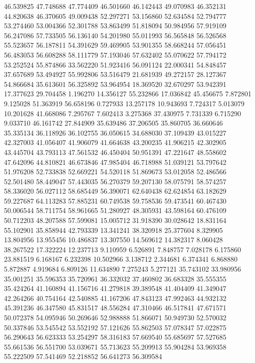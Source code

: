 46.539825
47.748688
47.774409
46.501660
46.142443
49.070983
46.352131
44.820638
46.370605
49.009438
52.297271
53.156860
52.634584
52.794777
53.274460
53.004366
52.301788
53.863499
51.818094
50.984956
57.919109
56.247086
57.733505
56.136140
54.201980
55.011993
56.565848
56.526568
55.523657
56.187811
54.391629
59.469905
53.901355
58.668244
57.056451
56.483053
56.608288
58.111779
57.193046
57.632402
55.070622
57.794172
53.252524
55.874866
33.562220
51.923416
56.091124
22.000341
54.848457
37.657689
53.494927
55.992806
53.516479
21.681939
49.272157
28.127367
54.866684
35.613601
56.325892
53.964954
18.369520
32.670297
53.942391
17.377623
29.704458
1.196270
14.356127
55.232866
17.036842
45.456675
7.872801
9.125028
51.363919
56.658196
0.727933
13.257178
10.943693
7.724317
5.013079
10.201628
41.668086
7.295767
7.602413
3.275368
37.430975
7.731339
6.715290
9.033710
46.161742
27.844909
35.639486
37.206505
35.860705
36.660646
35.335134
36.118926
36.102755
36.050615
34.688030
37.109439
43.015227
42.327003
41.056407
41.906079
41.664638
43.200235
41.906215
42.302905
43.445704
43.793113
47.561532
46.450404
50.951391
47.221647
48.558602
47.642096
44.810821
46.673846
47.985404
46.718988
51.039121
53.797642
51.976208
52.733838
52.669221
54.520118
51.869673
53.012058
52.486566
52.501480
58.449047
57.443035
56.270379
59.207130
58.075791
58.574257
58.336020
56.027112
58.685449
56.390071
62.640438
62.624854
63.182629
59.227687
64.113283
57.885231
60.749538
59.758536
59.473541
60.467430
50.006544
58.711754
58.961665
51.280927
48.305931
43.598164
60.476109
50.712203
48.207588
57.599081
15.005712
31.918390
30.028642
18.831164
55.102901
35.858944
42.793339
13.341241
38.320918
25.377604
8.329905
13.804956
13.955456
10.486837
13.307550
14.569612
14.382317
8.060428
38.267522
17.322224
12.237713
9.110959
6.526891
7.848757
7.028178
6.175860
23.881519
6.168167
6.232398
10.502966
3.138712
2.344681
6.374341
6.868880
5.872887
4.919684
6.809126
11.634890
7.275243
5.277121
35.743102
33.980956
35.001251
35.596353
35.720961
36.332032
37.460802
36.683328
35.555355
35.424264
41.160894
41.156716
41.279818
39.389548
41.404409
41.349047
42.264266
40.754164
42.540885
41.167206
47.843123
47.992463
44.932132
45.391236
46.347580
45.831517
48.556284
47.310466
46.517841
47.671571
50.072378
54.095946
50.269646
52.988888
51.866071
50.949730
52.570032
50.337846
53.545542
53.552192
57.121626
55.862503
57.078347
57.022875
56.290643
56.623333
53.254297
58.316183
57.669540
55.685697
57.527685
55.661536
56.551700
53.039671
55.713623
55.209913
55.904284
53.969358
55.222509
57.541469
52.218852
56.641273
56.309584
